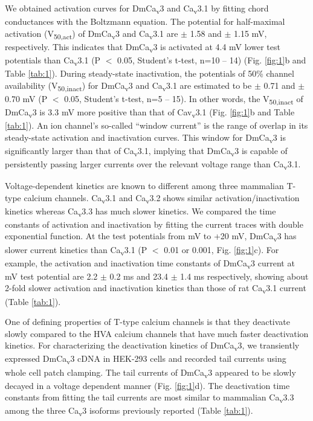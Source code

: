 We obtained activation curves for DmCa\textsubscript{v}3 and Ca\textsubscript{v}3.1 by fitting chord conductances with the Boltzmann equation. The potential for half-maximal activation (V\textsubscript{50,act}) of DmCa\textsubscript{v}3 and Ca\textsubscript{v}3.1 are  $\pm$ 1.58 and  $\pm$ 1.15 mV, respectively. This indicates that DmCa\textsubscript{v}3 is activated at 4.4 mV lower test potentials than Ca\textsubscript{v}3.1 (P $<$ 0.05, Student's t-test, n=10 -- 14) (Fig. \ref{fig:1}b and Table \ref{tab:1}).
During steady-state inactivation, the potentials of 50\% channel availability (V\textsubscript{50,inact}) for DmCa\textsubscript{v}3 and Ca\textsubscript{v}3.1 are estimated to be  $\pm$ 0.71 and  $\pm$ 0.70 mV (P $<$ 0.05, Student's t-test, n=5 -- 15). In other words, the V\textsubscript{50,inact} of DmCa\textsubscript{v}3 is 3.3 mV more positive than that of Cav\textsubscript{v}3.1 (Fig. \ref{fig:1}b and Table \ref{tab:1}).
An ion channel's so-called ``window current'' is the range of overlap in its steady-state activation and inactivation curves. This window for DmCa\textsubscript{v}3 is significantly larger than that of Ca\textsubscript{v}3.1, implying that DmCa\textsubscript{v}3 is capable of persistently passing larger currents over the relevant voltage range than Ca\textsubscript{v}3.1.

Voltage-dependent kinetics are known to different among three mammalian T-type calcium channels\cite{klockner:1999aa}.
Ca\textsubscript{v}3.1 and Ca\textsubscript{v}3.2 shows similar activation/inactivation kinetics whereas Ca\textsubscript{v}3.3 has much slower kinetics.
We compared the time constants of activation and inactivation by fitting the current traces with double exponential function.
At the test potentials from  mV to +20 mV,  DmCa\textsubscript{v}3 has slower current kinetics than Ca\textsubscript{v}3.1 (P $<$ 0.01 or 0.001, Fig. \ref{fig:1}c).
For example, the activation and inactivation time constants of DmCa\textsubscript{v}3 current at  mV test potential are 2.2 $\pm$ 0.2 ms and 23.4 $\pm$ 1.4 ms respectively, showing about 2-fold slower activation and inactivation kinetics than those of rat Ca\textsubscript{v}3.1 current (Table \ref{tab:1}).

One of defining properties of T-type calcium channels is that they deactivate slowly compared to the HVA calcium channels that have much faster deactivation kinetics\cite{PerezReyes:1998gn,lee:1999aa,matteson:1986aa}. 
For characterizing the deactivation kinetics of DmCa\textsubscript{v}3, we transiently expressed DmCa\textsubscript{v}3 cDNA in HEK-293 cells and recorded tail currents using whole cell patch clamping. 
The tail currents of DmCa\textsubscript{v}3 appeared to be slowly decayed in a voltage dependent manner (Fig. \ref{fig:1}d). 
The deactivation time constants from fitting the tail currents are most similar to mammalian Ca\textsubscript{v}3.3 among the three Ca\textsubscript{v}3 isoforms previously reported (Table \ref{tab:1}). 

